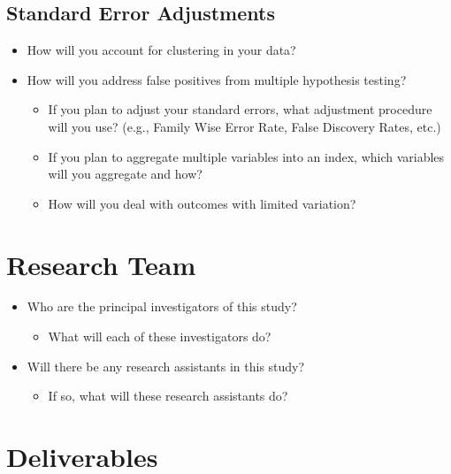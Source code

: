 \documentclass[
  letterpaper,
  DIV=11,
  numbers=noendperiod]{scrartcl}
\providecommand{\tightlist}{%
  \setlength{\itemsep}{0pt}\setlength{\parskip}{0pt}}\usepackage{longtable,booktabs,array}
\begin{document}
\subsection{Standard Error
Adjustments}\label{standard-error-adjustments}

\begin{itemize}
\tightlist
\item
  How will you account for clustering in your data?
\item
  How will you address false positives from multiple hypothesis testing?

  \begin{itemize}
  \tightlist
  \item
    If you plan to adjust your standard errors, what adjustment
    procedure will you use? (e.g., Family Wise Error Rate, False
    Discovery Rates, etc.)
  \item
    If you plan to aggregate multiple variables into an index, which
    variables will you aggregate and how?
  \item
    How will you deal with outcomes with limited variation?
  \end{itemize}
\end{itemize}

\section{Research Team}\label{research-team}

\begin{itemize}
\tightlist
\item
  Who are the principal investigators of this study?

  \begin{itemize}
  \tightlist
  \item
    What will each of these investigators do?
  \end{itemize}
\item
  Will there be any research assistants in this study?

  \begin{itemize}
  \tightlist
  \item
    If so, what will these research assistants do?
  \end{itemize}
\end{itemize}

\section{Deliverables}\label{deliverables}
\end{document}
